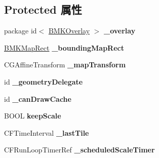 \subsection*{Protected 属性}
\begin{DoxyCompactItemize}
\item 
\hypertarget{interface_b_m_k_overlay_view_a1221418aafb1e98ab9caf88bb5fea5d7}{package id$<$ \hyperlink{protocol_b_m_k_overlay-p}{B\+M\+K\+Overlay} $>$ {\bfseries \+\_\+overlay}}\label{interface_b_m_k_overlay_view_a1221418aafb1e98ab9caf88bb5fea5d7}

\item 
\hypertarget{interface_b_m_k_overlay_view_a9c358f158a9d30b23ff8dddce028be61}{\hyperlink{struct_b_m_k_map_rect}{B\+M\+K\+Map\+Rect} {\bfseries \+\_\+bounding\+Map\+Rect}}\label{interface_b_m_k_overlay_view_a9c358f158a9d30b23ff8dddce028be61}

\item 
\hypertarget{interface_b_m_k_overlay_view_a33718c9269f4aad056f2360a368d65bb}{C\+G\+Affine\+Transform {\bfseries \+\_\+map\+Transform}}\label{interface_b_m_k_overlay_view_a33718c9269f4aad056f2360a368d65bb}

\item 
\hypertarget{interface_b_m_k_overlay_view_a811bdb8cdb5c83a3e91674eeb35db281}{id {\bfseries \+\_\+geometry\+Delegate}}\label{interface_b_m_k_overlay_view_a811bdb8cdb5c83a3e91674eeb35db281}

\item 
\hypertarget{interface_b_m_k_overlay_view_af3de42334db2d56dfe7b9c2674fcd6a2}{id {\bfseries \+\_\+can\+Draw\+Cache}}\label{interface_b_m_k_overlay_view_af3de42334db2d56dfe7b9c2674fcd6a2}

\item 
\hypertarget{interface_b_m_k_overlay_view_a4f7d62b7dfdc4502a2b95c678e4e0190}{B\+O\+O\+L {\bfseries keep\+Scale}}\label{interface_b_m_k_overlay_view_a4f7d62b7dfdc4502a2b95c678e4e0190}

\item 
\hypertarget{interface_b_m_k_overlay_view_ae28114032fc8056e491f11c6e41d9bda}{C\+F\+Time\+Interval {\bfseries \+\_\+last\+Tile}}\label{interface_b_m_k_overlay_view_ae28114032fc8056e491f11c6e41d9bda}

\item 
\hypertarget{interface_b_m_k_overlay_view_ae9feb5df6871e3e2cbc3ddd3fcfcefdc}{C\+F\+Run\+Loop\+Timer\+Ref {\bfseries \+\_\+scheduled\+Scale\+Timer}}\label{interface_b_m_k_overlay_view_ae9feb5df6871e3e2cbc3ddd3fcfcefdc}


\end{DoxyCompactItemize}
